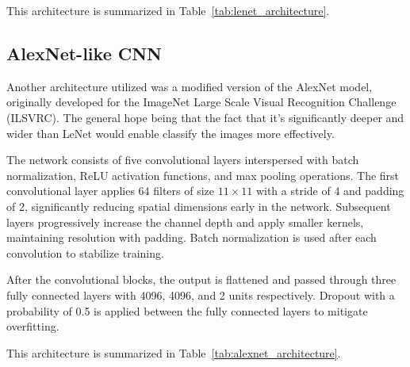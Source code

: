 \documentclass{pracalicmgr}
\begin{document}
This architecture is summarized in Table~\ref{tab:lenet_architecture}.


\subsection{AlexNet-like CNN}


Another architecture utilized was a modified version of the AlexNet model, originally developed for the ImageNet Large Scale Visual Recognition Challenge (ILSVRC). The general hope being that the fact that it's significantly deeper and wider than LeNet would enable classify the images more effectively.

The network consists of five convolutional layers interspersed with batch normalization, ReLU activation functions, and max pooling operations. The first convolutional layer applies 64 filters of size \(11 \times 11\) with a stride of 4 and padding of 2, significantly reducing spatial dimensions early in the network. Subsequent layers progressively increase the channel depth and apply smaller kernels, maintaining resolution with padding. Batch normalization is used after each convolution to stabilize training.

After the convolutional blocks, the output is flattened and passed through three fully connected layers with 4096, 4096, and 2 units respectively. Dropout with a probability of 0.5 is applied between the fully connected layers to mitigate overfitting.

This architecture is summarized in Table~\ref{tab:alexnet_architecture}.
\end{document}

